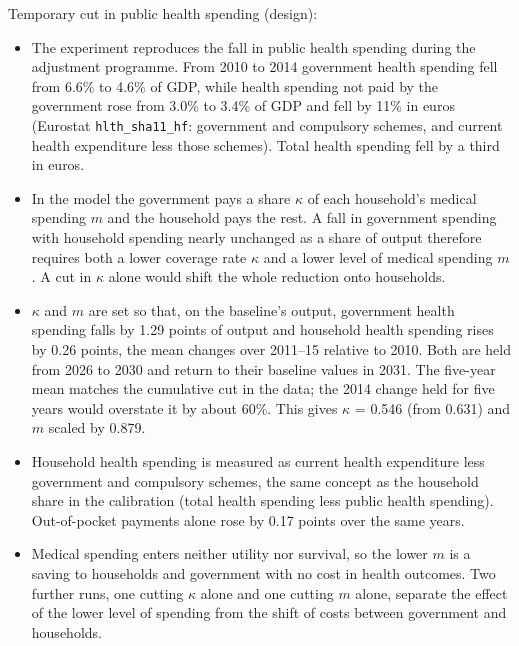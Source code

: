 \documentclass[11pt,a4paper]{article}
\begin{document}
\noindent Temporary cut in public health spending (design):
\begin{itemize}
\item The experiment reproduces the fall in public health spending during
  the adjustment programme. From 2010 to 2014 government health spending
  fell from 6.6\% to 4.6\% of GDP, while health spending not paid by the
  government rose from 3.0\% to 3.4\% of GDP and fell by 11\% in euros
  (Eurostat \texttt{hlth\_sha11\_hf}: government and compulsory schemes,
  and current health expenditure less those schemes). Total health
  spending fell by a third in euros.
\item In the model the government pays a share $\kappa$ of each household's
  medical spending $m$ and the household pays the rest. A fall in
  government spending with household spending nearly unchanged as a share
  of output therefore requires both a lower coverage rate $\kappa$ and a
  lower level of medical spending $m$. A cut in $\kappa$ alone would shift
  the whole reduction onto households.
\item $\kappa$ and $m$ are set so that, on the baseline's output, government
  health spending falls by 1.29 points of output and household health
  spending rises by 0.26 points, the mean changes over 2011--15 relative
  to 2010. Both are held from 2026 to 2030 and return to their baseline
  values in 2031. The five-year mean matches the cumulative cut in the
  data; the 2014 change held for five years would overstate it by about
  60\%. This gives $\kappa$ = 0.546 (from 0.631) and $m$ scaled by 0.879.
\item Household health spending is measured as current health expenditure
  less government and compulsory schemes, the same concept as the
  household share in the calibration (total health spending less public
  health spending). Out-of-pocket payments alone rose by 0.17 points over
  the same years.
\item Medical spending enters neither utility nor survival, so the lower
  $m$ is a saving to households and government with no cost in health
  outcomes. Two further runs, one cutting $\kappa$ alone and one cutting $m$
  alone, separate the effect of the lower level of spending from the shift
  of costs between government and households.
\end{itemize}
\end{document}
